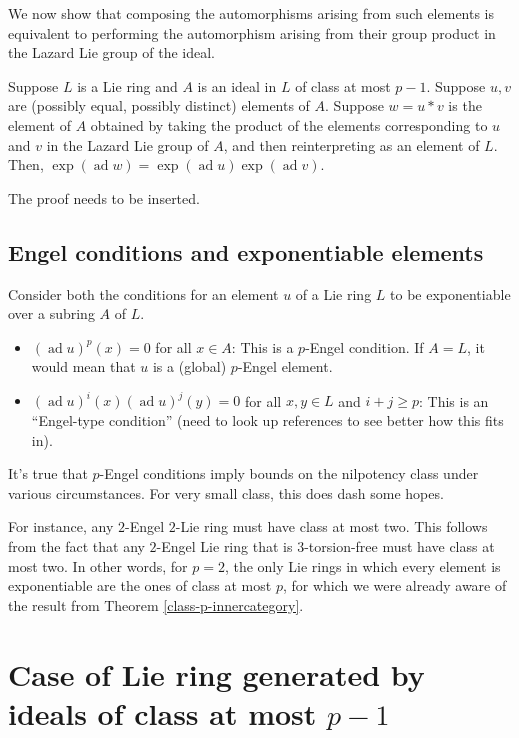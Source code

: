 \documentclass[10pt]{amsart}
\newcommand{\ad}{\operatorname{ad}}
\begin{document}
We now show that composing the automorphisms arising from such
elements is equivalent to performing the automorphism arising from
their group product in the Lazard Lie group of the ideal.

\begin{lemma}\label{small-class-ideal-exponentiable-group}
  Suppose $L$ is a Lie ring and $A$ is an ideal in $L$ of class at
  most $p - 1$. Suppose $u,v$ are (possibly equal, possibly distinct)
  elements of $A$. Suppose $w = u * v$ is the element of $A$ obtained
  by taking the product of the elements corresponding to $u$ and $v$
  in the Lazard Lie group of $A$, and then reinterpreting as an
  element of $L$. Then, $\exp(\ad w) = \exp(\ad u)\exp(\ad v)$.
\end{lemma}

The proof needs to be inserted.

\subsection{Engel conditions and exponentiable elements}

Consider both the conditions for an element $u$ of a Lie ring $L$ to
be exponentiable over a subring $A$ of $L$.

\begin{itemize}
\item $(\ad u)^p(x) = 0$ for all $x \in A$: This is a $p$-Engel
  condition. If $A = L$, it would mean that $u$ is a (global)
  $p$-Engel element.
\item $(\ad u)^i(x)(\ad u)^j(y) = 0$ for all $x,y \in L$ and $i + j
  \ge p$: This is an ``Engel-type condition'' (need to look up
  references to see better how this fits in).
\end{itemize}

It's true that $p$-Engel conditions imply bounds on the nilpotency
class under various circumstances. For very small class, this does
dash some hopes. 

For instance, any $2$-Engel $2$-Lie ring must have class at most
two. This follows from the fact that any $2$-Engel Lie ring that is
$3$-torsion-free must have class at most two. In other words, for $p =
2$, the only Lie rings in which every element is exponentiable are the
ones of class at most $p$, for which we were already aware of the
result from Theorem \ref{class-p-innercategory}.

\section{Case of Lie ring generated by ideals of class at most $p - 1$}
\end{document}
